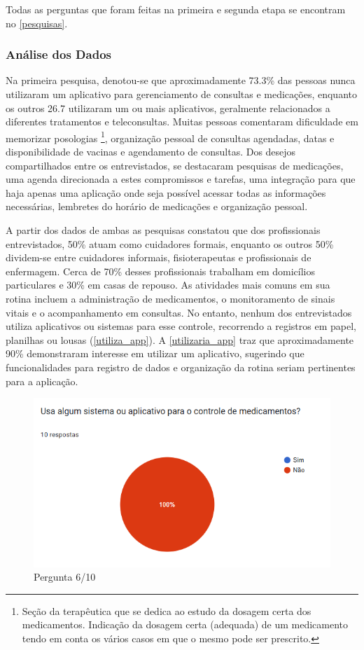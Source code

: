 \documentclass[
	article,			%
	12pt,				%
	oneside,			%
	a4paper,			%
    BIBLATEX,           %
	english,			%
	brazil,				%
	sumario=tradicional
	]{abntex2}
\begin{document}
Todas as perguntas que foram feitas na primeira e segunda etapa se encontram no \autoref{pesquisas}.

\subsubsection{Análise dos Dados}

Na primeira pesquisa, denotou-se que aproximadamente 73.3\% das pessoas nunca utilizaram um aplicativo para gerenciamento de consultas e medicações, enquanto os outros 26.7 utilizaram um ou mais aplicativos, geralmente relacionados a diferentes tratamentos e teleconsultas. Muitas pessoas comentaram dificuldade em memorizar posologias
\footnote[1]{Seção da terapêutica que se dedica ao estudo da dosagem certa dos medicamentos. Indicação da dosagem certa (adequada) de um medicamento tendo em conta os vários casos em que o mesmo pode ser prescrito.}, 
organização pessoal de consultas agendadas, datas e disponibilidade de vacinas e agendamento de consultas. Dos desejos compartilhados entre os entrevistados, se destacaram pesquisas de medicações, uma agenda direcionada a estes compromissos e tarefas, uma integração para que haja apenas uma aplicação onde seja possível acessar todas as informações necessárias, lembretes do horário de medicações e organização pessoal.

A partir dos dados de ambas as pesquisas constatou que dos profissionais entrevistados, 50\% atuam como cuidadores formais, enquanto os outros 50\% dividem-se entre cuidadores informais, fisioterapeutas e profissionais de enfermagem. Cerca de 70\% desses profissionais trabalham em domicílios particulares e 30\% em casas de repouso. As atividades mais comuns em sua rotina incluem a administração de medicamentos, o monitoramento de sinais vitais e o acompanhamento em consultas. No entanto, nenhum dos entrevistados utiliza aplicativos ou sistemas para esse controle, recorrendo a registros em papel, planilhas ou lousas (\autoref{utiliza_app}). A \autoref{utilizaria_app} traz que aproximadamente 90\% demonstraram interesse em utilizar um aplicativo, sugerindo que funcionalidades para registro de dados e organização da rotina seriam pertinentes para a aplicação.

\begin{figure}[!htbp]
    \centering
    \includegraphics[width=0.75\linewidth]{Figuras/utiliza-app.png}
    \caption{Pergunta 6/10}
    \label{utiliza_app}
\end{figure}
\end{document}
